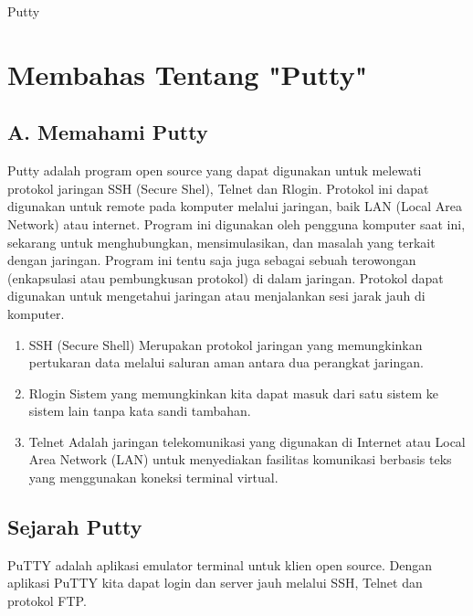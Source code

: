 
Putty

\section {Membahas Tentang "Putty"}

\subsection {A. Memahami Putty}

Putty adalah program open source yang dapat digunakan untuk melewati protokol jaringan SSH (Secure Shel), Telnet dan Rlogin. Protokol ini dapat digunakan untuk remote pada komputer melalui jaringan, baik LAN (Local Area Network) atau internet. Program ini digunakan oleh pengguna komputer saat ini, sekarang untuk menghubungkan, mensimulasikan, dan masalah yang terkait dengan jaringan. Program ini tentu saja juga sebagai sebuah terowongan (enkapsulasi atau pembungkusan protokol) di dalam jaringan.
Protokol dapat digunakan untuk mengetahui jaringan atau menjalankan sesi jarak jauh di komputer.

\begin{enumerate}

	\item SSH (Secure Shell)
	Merupakan protokol jaringan yang memungkinkan pertukaran data melalui saluran aman antara dua perangkat jaringan.

	\item Rlogin
	Sistem yang memungkinkan kita dapat masuk dari satu sistem ke sistem lain tanpa kata sandi tambahan.

	\item Telnet
	Adalah jaringan telekomunikasi yang digunakan di Internet atau Local Area Network (LAN) untuk menyediakan fasilitas komunikasi berbasis teks yang menggunakan koneksi terminal virtual.

\end{enumerate}


\subsection {Sejarah Putty}

PuTTY adalah aplikasi emulator terminal untuk klien open source. Dengan aplikasi PuTTY kita dapat login dan server jauh melalui SSH, Telnet dan protokol FTP.

